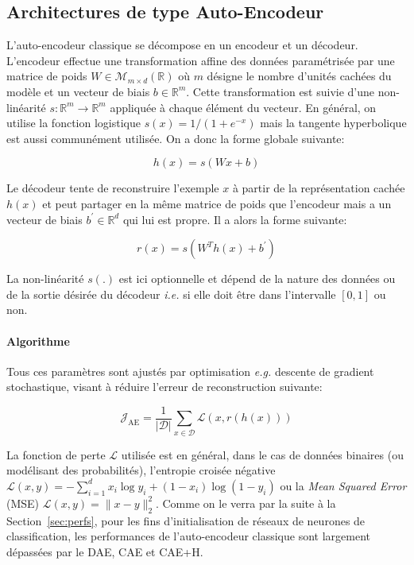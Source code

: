 \subsection{Architectures de type Auto-Encodeur}

L'auto-encodeur classique se décompose en un encodeur et un décodeur.
L'encodeur effectue une transformation affine des données paramétrisée par une
matrice de poids $W\in\mathcal{M}_{m\times d}(\mathbb{R})$ où $m$ désigne le
nombre d'unités cachées du modèle et un vecteur de biais $b\in\mathbb{R}^m$.
Cette transformation est suivie d'une non-linéarité $s:\mathbb{R}^m \rightarrow
\mathbb{R}^m$ appliquée à chaque élément du vecteur. En général, on utilise la
fonction logistique $s(x)=1/(1+e^{-x})$ mais la tangente hyperbolique est aussi
communément utilisée. On a donc la forme globale suivante:

\begin{equation}
h(x)=s(Wx+b)
\end{equation}

Le décodeur tente de reconstruire l'exemple $x$ à partir de la représentation
cachée $h(x)$ et peut partager en la m\^eme matrice de poids que l'encodeur
mais a un vecteur de biais $b^{'}\in\mathbb{R}^d$ qui lui est propre. Il a
alors la forme suivante:

\begin{equation}
r(x)=s(W^{T} h(x)+b^{'})
\end{equation} 

La non-linéarité $s(.)$ est ici optionnelle et dépend de la nature des données
ou de la sortie désirée du décodeur \textit{i.e.} si elle doit \^etre dans
l'intervalle $[0,1]$ ou non.  \\

\paragraph{Algorithme}
Tous ces paramètres sont ajustés par optimisation \textit{e.g.} descente de
gradient stochastique, visant à réduire l'erreur de reconstruction suivante:

\begin{equation}
\mathcal{J}_{\textrm{AE}} = \frac{1}{\vert \mathcal{D}\vert}\sum_{x\in\mathcal{D}}\mathcal{L}(x,r(h(x)))
\label{eq:ae}
\end{equation}

La fonction de perte $\mathcal{L}$ utilisée est en général, dans le cas de
données binaires (ou modélisant des probabilités), l'entropie croisée négative
$\mathcal{L}(x,y) = -\sum_{i=1}^d x_i\log y_i + (1-x_i)\log(1-y_i)$ ou la
\textit{Mean Squared Error} (MSE) $\mathcal{L}(x,y) = \| x-y\|^2_2$. Comme on
le verra par la suite à la Section~\ref{sec:perfs}, pour les fins
d'initialisation de réseaux de neurones de classification, les performances de
l'auto-encodeur classique sont largement dépassées par le DAE, CAE et CAE+H.

